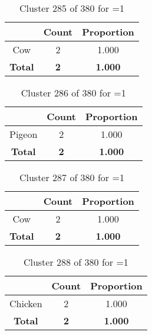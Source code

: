 \begin{table}[ht!]
\centering
\begin{tabular}{|c|c|c|}
\hline
\bf \Spec{} &\bf Count &\bf Proportion\\ \hline \hline
Cow & 2 & 1.000\\ \hline
\hline
\bf Total & \bf 2 & \bf 1.000\\ \hline
\end{tabular}
\label{tab:cluster:285:1}
\caption{Cluster 285 of 380 for \minneigh{}=1}
\end{table}

\begin{table}[ht!]
\centering
\begin{tabular}{|c|c|c|}
\hline
\bf \Spec{} &\bf Count &\bf Proportion\\ \hline \hline
Pigeon & 2 & 1.000\\ \hline
\hline
\bf Total & \bf 2 & \bf 1.000\\ \hline
\end{tabular}
\label{tab:cluster:286:1}
\caption{Cluster 286 of 380 for \minneigh{}=1}
\end{table}

\begin{table}[ht!]
\centering
\begin{tabular}{|c|c|c|}
\hline
\bf \Spec{} &\bf Count &\bf Proportion\\ \hline \hline
Cow & 2 & 1.000\\ \hline
\hline
\bf Total & \bf 2 & \bf 1.000\\ \hline
\end{tabular}
\label{tab:cluster:287:1}
\caption{Cluster 287 of 380 for \minneigh{}=1}
\end{table}

\begin{table}[ht!]
\centering
\begin{tabular}{|c|c|c|}
\hline
\bf \Spec{} &\bf Count &\bf Proportion\\ \hline \hline
Chicken & 2 & 1.000\\ \hline
\hline
\bf Total & \bf 2 & \bf 1.000\\ \hline
\end{tabular}
\label{tab:cluster:288:1}
\caption{Cluster 288 of 380 for \minneigh{}=1}
\end{table}

